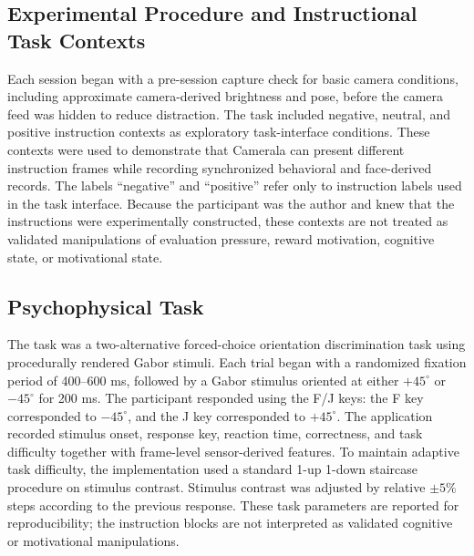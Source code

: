 \documentclass[dvipdfmx]{ehis}
\begin{document}
\subsection{Experimental Procedure and Instructional Task Contexts}
Each session began with a pre-session capture check for basic camera conditions, including approximate camera-derived brightness and pose, before the camera feed was hidden to reduce distraction.
The task included negative, neutral, and positive instruction contexts as exploratory task-interface conditions.
These contexts were used to demonstrate that Camerala can present different instruction frames while recording synchronized behavioral and face-derived records.
The labels ``negative'' and ``positive'' refer only to instruction labels used in the task interface.
Because the participant was the author and knew that the instructions were experimentally constructed, these contexts are not treated as validated manipulations of evaluation pressure, reward motivation, cognitive state, or motivational state.

\subsection{Psychophysical Task}
The task was a two-alternative forced-choice orientation discrimination task using procedurally rendered Gabor stimuli.
Each trial began with a randomized fixation period of 400--600 ms, followed by a Gabor stimulus oriented at either $+45^\circ$ or $-45^\circ$ for 200 ms.
The participant responded using the F/J keys: the F key corresponded to $-45^\circ$, and the J key corresponded to $+45^\circ$.
The application recorded stimulus onset, response key, reaction time, correctness, and task difficulty together with frame-level sensor-derived features.
To maintain adaptive task difficulty, the implementation used a standard 1-up 1-down staircase procedure on stimulus contrast.
Stimulus contrast was adjusted by relative $\pm 5\%$ steps according to the previous response.
These task parameters are reported for reproducibility; the instruction blocks are not interpreted as validated cognitive or motivational manipulations.
\end{document}
